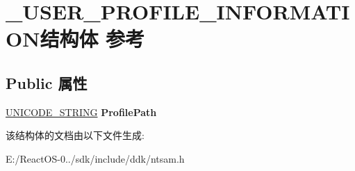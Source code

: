 \hypertarget{struct___u_s_e_r___p_r_o_f_i_l_e___i_n_f_o_r_m_a_t_i_o_n}{}\section{\+\_\+\+U\+S\+E\+R\+\_\+\+P\+R\+O\+F\+I\+L\+E\+\_\+\+I\+N\+F\+O\+R\+M\+A\+T\+I\+O\+N结构体 参考}
\label{struct___u_s_e_r___p_r_o_f_i_l_e___i_n_f_o_r_m_a_t_i_o_n}
\subsection*{Public 属性}
\begin{DoxyCompactItemize}
\item 
\mbox{\label{struct___u_s_e_r___p_r_o_f_i_l_e___i_n_f_o_r_m_a_t_i_o_n_a1011a99bef8ab0178b12532645e5f3de}} 
\hyperlink{struct___u_n_i_c_o_d_e___s_t_r_i_n_g}{U\+N\+I\+C\+O\+D\+E\+\_\+\+S\+T\+R\+I\+NG} {\bfseries Profile\+Path}
\end{DoxyCompactItemize}


该结构体的文档由以下文件生成\+:\begin{DoxyCompactItemize}
\item 
E\+:/\+React\+O\+S-\/0../sdk/include/ddk/ntsam.\+h\end{DoxyCompactItemize}
